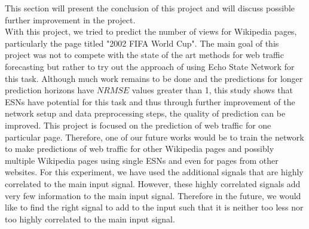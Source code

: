   This section will present the conclusion of this project and will discuss possible further improvement in the project.\\  With this project, we tried to predict the number of views for Wikipedia pages, particularly the page titled "2002 FIFA World Cup". The main goal of this project was not to compete with the state of the art methods for web traffic forecasting but rather to try out the approach of using Echo State Network for this task. Although much work remains to be done and the predictions for longer prediction horizons have $NRMSE$  values greater than 1, this study shows that ESNs have potential for this task and thus through further improvement of the network setup and data preprocessing steps, the quality of prediction can be improved. This project is focused on the prediction of web traffic for one particular page. Therefore, one of our future works would be to train the network to make predictions of web traffic for other Wikipedia pages and possibly multiple Wikipedia pages using single ESNs  and even for pages from other websites. For this experiment, we have used the additional signals that are highly correlated to the main input signal. However, these highly correlated signals add very few information to the main input signal. Therefore in the future, we would like to find the right signal to add to the input such that it is neither too less nor too highly correlated to the main input signal.